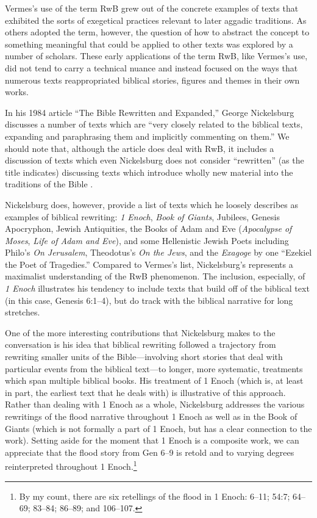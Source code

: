 Vermes's use of the term RwB grew out of the concrete examples of texts
that exhibited the sorts of exegetical practices relevant to later
aggadic traditions. As others adopted the term, however, the question of
how to abstract the concept to something meaningful that could be
applied to other texts was explored by a number of scholars. These early
applications of the term RwB, like Vermes's use, did not tend to carry a
technical nuance and instead focused on the ways that numerous texts
reappropriated biblical stories, figures and themes in their own works.

In his 1984 article ``The Bible Rewritten and Expanded,'' George
Nickelsburg discusses a number of texts which are ``very closely related
to the biblical texts, expanding and paraphrasing them and implicitly
commenting on them.''\autocite[89]{nickelsburg_stone1984} We should note
that, although the article does deal with RwB, it includes a discussion
of texts which even Nickelsburg does not consider ``rewritten'' (as the
title indicates) discussing texts which introduce wholly new material
into the traditions of the Bible
\autocite[89--90]{nickelsburg_stone1984}.

Nickelsburg does, however, provide a list of texts which he loosely
describes as examples of biblical rewriting: \emph{1 Enoch}, \emph{Book
of Giants}, Jubilees, Genesis Apocryphon, Jewish Antiquities, the Books
of Adam and Eve (\emph{Apocalypse of Moses}, \emph{Life of Adam and
Eve}), and some Hellenistic Jewish Poets including Philo's \emph{On
Jerusalem}, Theodotus's \emph{On the Jews}, and the \emph{Exagoge} by
one ``Ezekiel the Poet of Tragedies.'' Compared to Vermes's list,
Nickelsburg's represents a maximalist understanding of the RwB
phenomenon. The inclusion, especially, of \emph{1 Enoch} illustrates his
tendency to include texts that build off of the biblical text (in this
case, Genesis 6:1--4), but do track with the biblical narrative for long
stretches.

One of the more interesting contributions that Nickelsburg makes to the
conversation is his idea that biblical rewriting followed a trajectory
from rewriting smaller units of the Bible---involving short stories that
deal with particular events from the biblical text---to longer, more
systematic, treatments which span multiple biblical books. His treatment
of 1 Enoch (which is, at least in part, the earliest text that he deals
with) is illustrative of this approach. Rather than dealing with 1 Enoch
as a whole, Nickelsburg addresses the various rewritings of the flood
narrative throughout 1 Enoch as well as in the Book of Giants (which is
not formally a part of 1 Enoch, but has a clear connection to the work).
Setting aside for the moment that 1 Enoch is a composite work, we can
appreciate that the flood story from Gen 6--9 is retold and to varying
degrees reinterpreted throughout 1 Enoch.\footnote{By my count, there
  are six retellings of the flood in 1 Enoch: 6--11; 54:7; 64--69;
  83--84; 86--89; and 106--107.}

